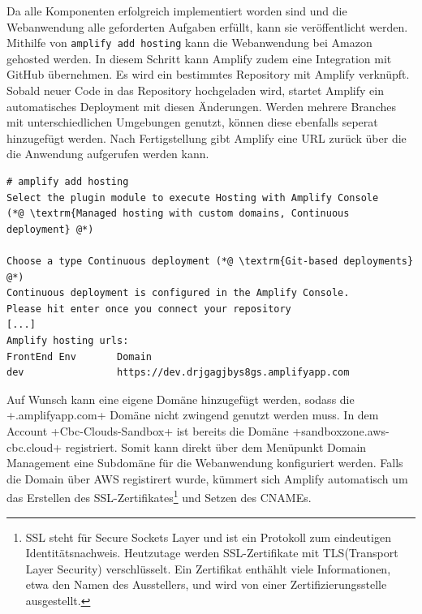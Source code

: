Da alle Komponenten erfolgreich implementiert worden sind und die Webanwendung alle geforderten Aufgaben erfüllt, kann sie veröffentlicht werden.
Mithilfe von \verb+amplify add hosting+ kann die Webanwendung bei Amazon gehosted werden.
In diesem Schritt kann Amplify zudem eine Integration mit GitHub übernehmen.
Es wird ein bestimmtes Repository mit Amplify verknüpft.
Sobald neuer Code in das Repository hochgeladen wird, startet Amplify ein automatisches Deployment mit diesen Änderungen.
Werden mehrere Branches mit unterschiedlichen Umgebungen genutzt, können diese ebenfalls seperat hinzugefügt werden.
Nach Fertigstellung gibt Amplify eine URL zurück über die die Anwendung aufgerufen werden kann.
\\
\begin{lstlisting}[basicstyle=\ttfamily\small, breaklines=true , frame = single, backgroundcolor=\color{flashwhite} ]
# amplify add hosting
Select the plugin module to execute Hosting with Amplify Console
(*@ \textrm{Managed hosting with custom domains, Continuous deployment} @*)

Choose a type Continuous deployment (*@ \textrm{Git-based deployments} @*)
Continuous deployment is configured in the Amplify Console.
Please hit enter once you connect your repository
[...]
Amplify hosting urls:
FrontEnd Env       Domain
dev                https://dev.drjgagjbys8gs.amplifyapp.com

    \end{lstlisting}
\clearpage
Auf Wunsch kann eine eigene Domäne hinzugefügt werden, sodass die \spverb+.amplifyapp.com+ Domäne nicht zwingend genutzt werden muss.
In dem Account \spverb+Cbc-Clouds-Sandbox+ ist bereits die Domäne \spverb+sandboxzone.aws-cbc.cloud+ registriert.
Somit kann direkt über dem Menüpunkt \glqq Domain Management\grqq{} eine Subdomäne für die Webanwendung konfiguriert werden.
Falls die Domain über AWS registirert wurde, kümmert sich Amplify automatisch um das Erstellen des SSL-Zertifikates\footnote{SSL steht für Secure Sockets Layer und ist ein Protokoll zum eindeutigen Identitätsnachweis. Heutzutage werden SSL-Zertifikate mit TLS(Transport Layer Security) verschlüsselt. Ein Zertifikat enthählt viele Informationen, etwa den Namen des Ausstellers, und wird von einer Zertifizierungsstelle ausgestellt.} und Setzen des CNAMEs.\\


